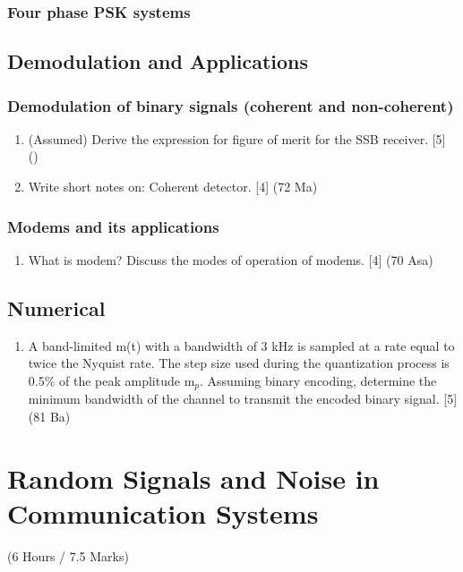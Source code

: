 \documentclass[12pt]{article}
\begin{document}
    \subsubsection{Four phase PSK systems}
  \subsection{Demodulation and Applications}
    \subsubsection{Demodulation of binary signals (coherent and non-coherent)}
      \begin{enumerate}
        \item (Assumed) Derive the expression for figure of merit for the SSB receiver. \hfill [5] ()

        \item Write short notes on: Coherent detector. \hfill [4] (72 Ma)
      \end{enumerate}

    \subsubsection{Modems and its applications}
    	\begin{enumerate}
    		\item What is modem? Discuss the modes of operation of modems. \hfill [4] (70 Asa)
    	\end{enumerate}
    
  \subsection{Numerical}
  	\begin{enumerate}
  		\item A band-limited m(t) with a bandwidth of 3 kHz is sampled at a rate equal to twice the Nyquist rate. The step size used during the quantization process is 0.5\% of the peak amplitude m$_p$. Assuming binary encoding, determine the minimum bandwidth of the channel to transmit the encoded binary signal. \hfill [5] (81 Ba)
  	\end{enumerate}

\pagebreak

\section{Random Signals and Noise in Communication Systems}
  \begin{center}(6 Hours / 7.5 Marks)\end{center}
\end{document}
